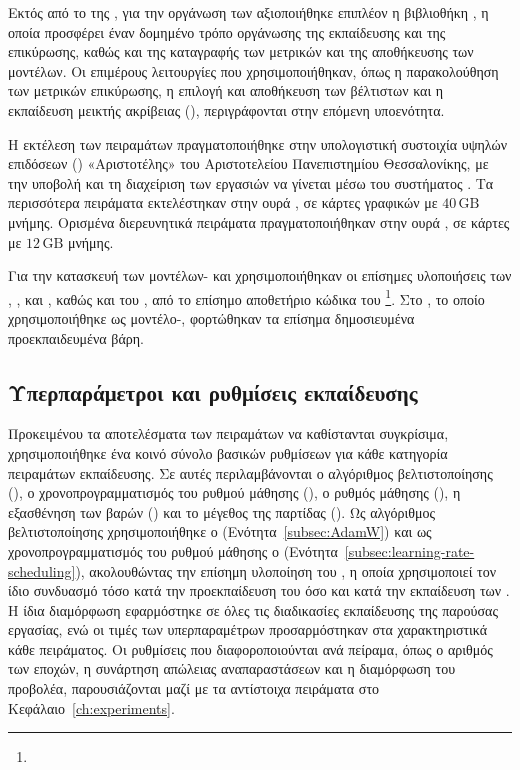 Εκτός από το  της , για την οργάνωση των  αξιοποιήθηκε επιπλέον η
βιβλιοθήκη  \cite{falcon2019pytorchlightning}, η
οποία προσφέρει έναν δομημένο τρόπο οργάνωσης της εκπαίδευσης και της
επικύρωσης, καθώς και της καταγραφής των μετρικών και της αποθήκευσης
των μοντέλων. Οι επιμέρους λειτουργίες που χρησιμοποιήθηκαν, όπως η
παρακολούθηση των μετρικών επικύρωσης, η επιλογή και αποθήκευση των
βέλτιστων  και η εκπαίδευση μεικτής ακρίβειας (),
περιγράφονται στην επόμενη υποενότητα.

Η εκτέλεση των πειραμάτων πραγματοποιήθηκε στην υπολογιστική συστοιχία
υψηλών επιδόσεων ()
«Αριστοτέλης» του Αριστοτελείου Πανεπιστημίου Θεσσαλονίκης, με την
υποβολή και τη διαχείριση των εργασιών να γίνεται μέσω του συστήματος
. Τα περισσότερα πειράματα εκτελέστηκαν στην ουρά
, σε κάρτες γραφικών  με
\(40\,\mathrm{GB}\) μνήμης. Ορισμένα διερευνητικά πειράματα
πραγματοποιήθηκαν στην ουρά , σε κάρτες
 με \(12\,\mathrm{GB}\) μνήμης.

Για την κατασκευή των μοντέλων- και 
χρησιμοποιήθηκαν οι επίσημες υλοποιήσεις των ,
,  και , καθώς και του
, από το επίσημο αποθετήριο κώδικα του
\footnote{}.
Στο , το οποίο χρησιμοποιήθηκε ως
μοντέλο-, φορτώθηκαν τα επίσημα δημοσιευμένα
προεκπαιδευμένα βάρη.

\subsection{Υπερπαράμετροι και ρυθμίσεις εκπαίδευσης}
\label{subsec:training-settings}

Προκειμένου τα αποτελέσματα των πειραμάτων να καθίστανται συγκρίσιμα,
χρησιμοποιήθηκε ένα κοινό σύνολο βασικών ρυθμίσεων για κάθε κατηγορία
πειραμάτων εκπαίδευσης. Σε αυτές περιλαμβάνονται ο αλγόριθμος
βελτιστοποίησης (), ο χρονοπρογραμματισμός του ρυθμού μάθησης (), ο ρυθμός
μάθησης (), η εξασθένηση των βαρών () και το μέγεθος της παρτίδας (). Ως αλγόριθμος
βελτιστοποίησης χρησιμοποιήθηκε ο 
(Ενότητα~\ref{subsec:AdamW}) και ως χρονοπρογραμματισμός του ρυθμού
μάθησης ο 
(Ενότητα~\ref{subsec:learning-rate-scheduling}), ακολουθώντας την
επίσημη υλοποίηση του , η οποία χρησιμοποιεί τον ίδιο
συνδυασμό τόσο κατά την προεκπαίδευση του  όσο και κατά
την εκπαίδευση των . Η ίδια διαμόρφωση
εφαρμόστηκε σε όλες τις διαδικασίες εκπαίδευσης της παρούσας εργασίας,
ενώ οι τιμές των υπερπαραμέτρων προσαρμόστηκαν στα χαρακτηριστικά κάθε
πειράματος.
Οι ρυθμίσεις που διαφοροποιούνται ανά πείραμα, όπως ο αριθμός των εποχών,
η συνάρτηση απώλειας αναπαραστάσεων και η διαμόρφωση του προβολέα,
παρουσιάζονται μαζί με τα αντίστοιχα πειράματα στο
Κεφάλαιο~\ref{ch:experiments}.

